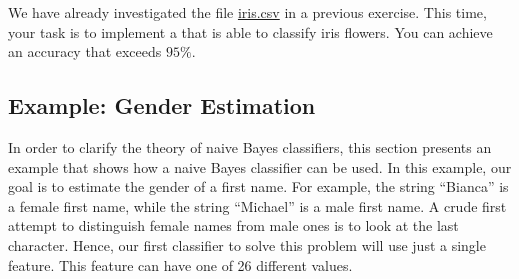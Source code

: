 \exercise
We have already investigated the file
\href{https://github.com/karlstroetmann/Artificial-Intelligence/blob/master/Python/iris.csv}{iris.csv}
in a previous exercise.   This time, your task is to implement a  that is able to
classify iris flowers.  You can achieve an accuracy that exceeds $95\%$.
\eox

\subsection{Example: Gender Estimation}
In order to clarify the theory of naive Bayes classifiers, this section presents an example that shows how a
naive Bayes classifier can be used.  In this example, our goal is to estimate the gender of a first name.  For
example, the string ``Bianca'' is a female first name, while the string ``Michael'' is a male first name.
A crude first attempt to distinguish female names from male ones is to look at the last character.  Hence, our
first classifier to solve this problem will use just a single feature.  This feature can have one of 26
different values.
 
